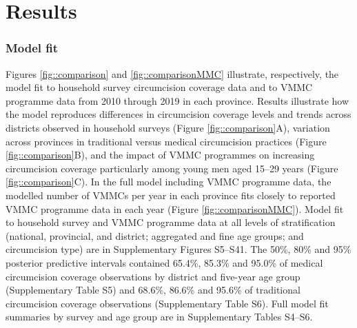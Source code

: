 \documentclass{article}
\begin{document}
\section*{Results}



\subsubsection*{Model fit}


Figures \ref{fig::comparison} and \ref{fig::comparisonMMC} illustrate, respectively, the model fit to household survey circumcision coverage data and to VMMC programme data from 2010 through 2019 in each province. Results illustrate how the model reproduces differences in circumcision coverage levels and trends across districts observed in household surveys (Figure \ref{fig::comparison}A), variation across provinces in traditional versus medical circumcision practices (Figure \ref{fig::comparison}B), and the impact of VMMC programmes on increasing circumcision coverage particularly among young men aged 15--29 years (Figure \ref{fig::comparison}C). In the full model including VMMC programme data, the modelled number of VMMCs per year in each province fits closely to reported VMMC programme data in each year (Figure \ref{fig::comparisonMMC}). Model fit to household survey and VMMC programme data at all levels of stratification (national, provincial, and district; aggregated and fine age groups; and circumcision type) are in Supplementary Figures S5--S41. The 50\%, 80\% and 95\% posterior predictive intervals contained 65.4\%, 85.3\% and 95.0\% of medical circumcision coverage observations by district and five-year age group (Supplementary Table S5) and 68.6\%, 86.6\% and 95.6\% of traditional circumcision coverage observations (Supplementary Table S6). Full model fit summaries by survey and age group are in Supplementary Tables S4--S6.


\end{document}
